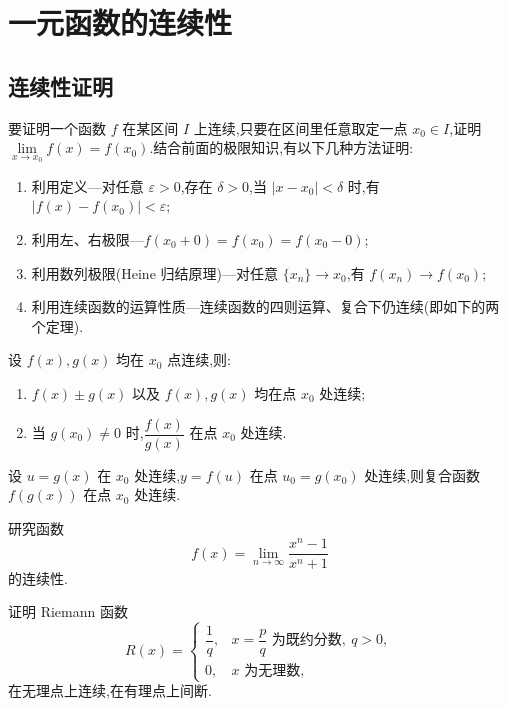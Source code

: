 \documentclass[../数学分析培优讲义.tex]{subfiles}
\begin{document}
\setcounter{chapter}{2}
\pagestyle{fancy}

\chapter{一元函数的连续性}


\section{连续性证明}

要证明一个函数 $f$ 在某区间 $I$ 上连续,只要在区间里任意取定一点 $x_0\in I$,证明 $\displaystyle\lim\limits_{x\to x_0}f(x)=f(x_0)$.结合前面的极限知识,有以下几种方法证明:
\begin{enumerate}[label=\textcircled{\arabic*},leftmargin=2.2em]
    \item 利用定义---对任意 $\varepsilon>0$,存在 $\delta>0$,当 $|x-x_0|<\delta$ 时,有 $|f(x)-f(x_0)|<\varepsilon$;
    \item 利用左、右极限---$f(x_0+0)=f(x_0)=f(x_0-0)$;
    \item 利用数列极限(Heine 归结原理)---对任意 $\{x_n\}\to x_0$,有 $f(x_n)\to f(x_0)$;
    \item 利用连续函数的运算性质---连续函数的四则运算、复合下仍连续(即如下的两个定理).
\end{enumerate}

\begin{theorem}[\markstar]
设 $f(x),g(x)$ 均在 $x_0$ 点连续,则:
\begin{enumerate}[label=(\arabic*)]
    \item $f(x)\pm g(x)$ 以及 $f(x),g(x)$ 均在点 $x_0$ 处连续;
    \item 当 $g(x_0)\neq0$ 时,$\dfrac{f(x)}{g(x)}$ 在点 $x_0$ 处连续.
\end{enumerate}
\end{theorem}

\begin{theorem}[\markstar]
设 $u=g(x)$ 在 $x_0$ 处连续,$y=f(u)$ 在点 $u_0=g(x_0)$ 处连续,则复合函数 $f(g(x))$ 在点 $x_0$ 处连续.
\end{theorem}

\begin{example}
研究函数
\[
    f(x)=\lim\limits_{n\to\infty}\dfrac{x^n-1}{x^n+1}
\]
的连续性.
\end{example}
\exampleblank

\begin{example}[\markstar]
证明 Riemann 函数
\[
R(x)=
\begin{cases}
    \dfrac{1}{q}, & x=\dfrac{p}{q}\text{ 为既约分数},\ q>0,\\
    0, & x\text{ 为无理数},
\end{cases}
\]
在无理点上连续,在有理点上间断.
\end{example}
\exampleblank
\end{document}
